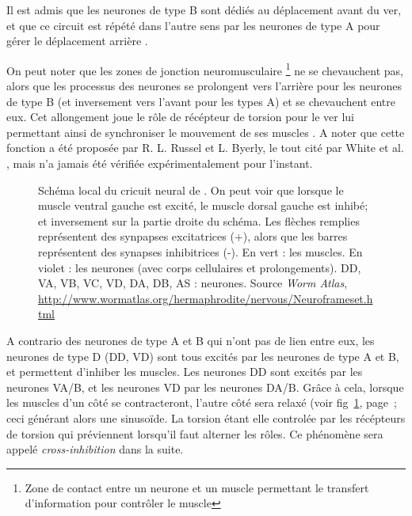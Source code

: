 Il est admis que les neurones de type B sont dédiés au déplacement avant du ver,
et que ce circuit est répété dans l'autre sens par les neurones de type A
pour gérer le déplacement arrière \cite{AltunZ.F.andHall2011,Boyle2009,White1986}.

On peut noter que les zones de jonction neuromusculaire \footnote{Zone de
contact entre un neurone et un muscle permettant le transfert d'information 
pour contrôler le muscle} ne se chevauchent pas, alors que les processus
des neurones se prolongent vers l'arrière pour les neurones de type B (et
inversement vers l'avant pour les types A) et se chevauchent entre eux. Cet
allongement joue le rôle de récépteur de torsion pour le ver lui permettant
ainsi de synchroniser le mouvement de ses muscles \cite{Boyle2009}. A noter que
cette fonction a été proposée par R. L. Russel et L. Byerly, le tout cité par
White et al. \cite{White1986}, mais n'a jamais été vérifiée expérimentalement
pour l'instant.


\begin{figure}[ht]
   \begin{center}
   \end{center}
   \caption{Schéma local du cricuit neural de \celeg{}. On peut voir
   que lorsque le muscle ventral gauche est excité, le muscle dorsal gauche est
   inhibé; et inversement sur la partie droite du schéma. Les flèches remplies
   représentent des synpapses excitatrices (+), alors que les barres représentent des
   synapses inhibitrices (-). En vert : les muscles. En violet : les neurones (avec corps cellulaires et prolongements).
DD, VA, VB, VC, VD, DA, DB, AS : neurones. Source \textit{Worm Atlas},
   \url{http://www.wormatlas.org/hermaphrodite/nervous/Neuroframeset.html}}
   \label{fig:alternance_dv}
\end{figure}

A contrario des neurones de type A et B qui n'ont pas de lien entre eux, les
neurones de type D (DD, VD) sont tous excités par les neurones de type A et B,
et permettent d'inhiber les muscles. Les neurones DD sont excités par les
neurones VA/B, et les neurones VD par les neurones DA/B. Grâce à cela, lorsque
les muscles d'un côté se contracteront, l'autre côté sera relaxé (voir
fig~\ref{fig:alternance_dv}, page~\pageref{fig:alternance_dv}; ceci générant
alors une sinusoïde. La torsion étant elle controlée par les récépteurs de
torsion qui préviennent lorsqu'il faut alterner les rôles. Ce phénomène sera
appelé \textit{cross-inhibition} dans la suite.\\


